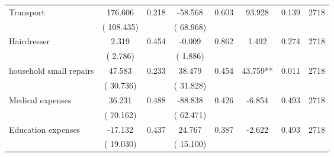 \begin{tabular}{l*{7}{c}}
 Transport       &            176.606       &        0.218  &            -58.568       &        0.603  &             93.928       &              0.139 &  2718 \\ 
                       &       (     108.435)             &                               &       (      68.968)                     &                               &                                               &                                &                      \\ 

 Hairdresser       &              2.319       &        0.454  &             -0.009       &        0.862  &              1.492       &              0.274 &  2718 \\ 
                       &       (       2.786)             &                               &       (       1.886)                     &                               &                                               &                                &                      \\ 

 household small repairs       &             47.583       &        0.233  &             38.479       &        0.454  &             43.759**       &              0.011 &  2718 \\ 
                       &       (      30.736)             &                               &       (      31.828)                     &                               &                                               &                                &                      \\ 

 Medical expenses       &             36.231       &        0.488  &            -88.838       &        0.426  &             -6.854       &              0.493 &  2718 \\ 
                       &       (      70.162)             &                               &       (      62.471)                     &                               &                                               &                                &                      \\ 

 Education expenses       &            -17.132       &        0.437  &             24.767       &        0.387  &             -2.622       &              0.493 &  2718 \\ 
                       &       (      19.030)             &                               &       (      15.100)                     &                               &                                               &                                &                      \\ 


\end{tabular}
